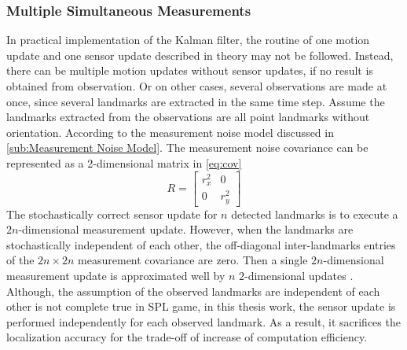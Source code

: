 \subsubsection{Multiple Simultaneous Measurements}
In practical implementation of the Kalman filter, the routine of one motion update and one sensor update described in theory may not be followed. Instead, there can be multiple motion updates without sensor updates, if no result is obtained from observation. Or on other cases, several observations are made at once, since several landmarks are extracted in the same time step. Assume the landmarks extracted from the observations are all point landmarks without orientation. According to the measurement noise model discussed in \autoref{sub:Measurement Noise Model}. The measurement noise covariance can be represented as a 2-dimensional matrix in \autoref{eq:cov}
\begin{equation}
  \label{eq:cov}
  R = 
  \begin{bmatrix}
    r_x^2 & 0 \\ 
    0 & r_y^2
  \end{bmatrix}
\end{equation}
The stochastically correct sensor update for $n$ detected landmarks is to execute a $2n$-dimensional measurement update. However, when the landmarks are stochastically independent of each other, the off-diagonal inter-landmarks entries of the $2n \times 2n$ measurement covariance are zero. Then a single $2n$-dimensional measurement update is approximated well by $n$ $2$-dimensional updates \cite{Tasse2013}. Although, the assumption of the observed landmarks are independent of each other is not complete true in \gls{SPL} game, in this thesis work, the sensor update is performed independently for each observed landmark. As a result, it sacrifices the localization accuracy for the trade-off of increase of computation efficiency.

